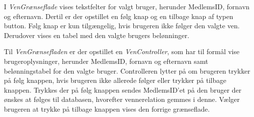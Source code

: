 \noindent
I \textit{VenGrænseflade} vises tekstfelter for valgt bruger, herunder MedlemsID, fornavn og efternavn. Dertil er der opstillet en følg knap og en tilbage knap af typen button. Følg knap er kun tilgængelig, hvis brugeren ikke følger den valgte ven. Derudover vises en tabel med den valgte brugers belønninger.


Til \textit{VenGrænsefladen} er der opstillet en \textit{VenController}, som har til formål vise brugeroplysninger, herunder MedlemsID, fornavn og efternavn samt belønningstabel for den valgte bruger. Controlleren lytter på om brugeren trykker på følg knappen, hvis brugeren ikke allerede følger eller trykker på tilbage knappen. Trykkes der på følg knappen sendes MedlemsID'et på den bruger der ønskes at følges til databasen, hvorefter vennerelation gemmes i denne. Vælger brugeren at trykke på tilbage knappen vises den forrige grænseflade.   